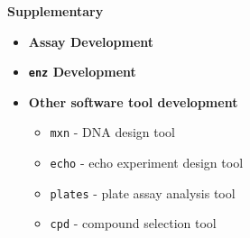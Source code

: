 \documentclass{article}
\begin{document}
\par
{\large \textbf{Supplementary}}
\begin{itemize}
	\item \textbf{Assay Development}
	\item \textbf{\texttt{enz} Development}
	\item \textbf{Other software tool development} 
		\begin{itemize}
			\item \texttt{mxn} - DNA design tool
			\item \texttt{echo} - echo experiment design tool
			\item \texttt{plates} - plate assay analysis tool
			\item \texttt{cpd} - compound selection tool
		\end{itemize}
\end{itemize}
\par
\printbibliography
\end{document}
